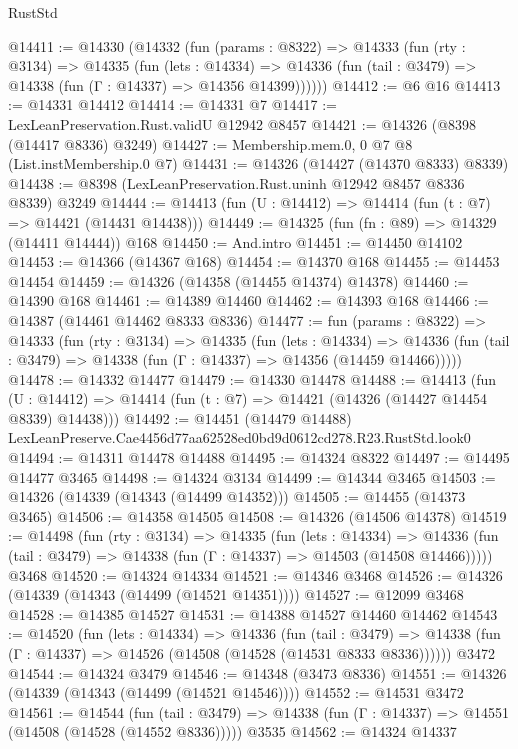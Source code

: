 \begin{lexlean}{RustStd}
\begin{coremodule}
@14411 := @14330
    (@14332
      (fun (params : @8322) =>
      @14333
        (fun (rty : @3134) =>
        @14335
          (fun (lets : @14334) =>
          @14336 (fun (tail : @3479) => @14338 (fun (Γ : @14337) => @14356 @14399))))))
@14412 := @6 @16
@14413 := @14331 @14412
@14414 := @14331 @7
@14417 := LexLeanPreservation.Rust.validU @12942 @8457
@14421 := @14326 (@8398 (@14417 @8336) @3249)
@14427 := Membership.mem.{0, 0} @7 @8 (List.instMembership.{0} @7)
@14431 := @14326 (@14427 (@14370 @8333) @8339)
@14438 := @8398 (LexLeanPreservation.Rust.uninh @12942 @8457 @8336 @8339) @3249
@14444 := @14413 (fun (U : @14412) => @14414 (fun (t : @7) => @14421 (@14431 @14438)))
@14449 := @14325 (fun (fn : @89) => @14329 (@14411 @14444)) @168
@14450 := And.intro
@14451 := @14450 @14102
@14453 := @14366 (@14367 @168)
@14454 := @14370 @168
@14455 := @14453 @14454
@14459 := @14326 (@14358 (@14455 @14374) @14378)
@14460 := @14390 @168
@14461 := @14389 @14460
@14462 := @14393 @168
@14466 := @14387 (@14461 @14462 @8333 @8336)
@14477 := fun (params : @8322) =>
  @14333
    (fun (rty : @3134) =>
    @14335
      (fun (lets : @14334) =>
      @14336 (fun (tail : @3479) => @14338 (fun (Γ : @14337) => @14356 (@14459 @14466)))))
@14478 := @14332 @14477
@14479 := @14330 @14478
@14488 := @14413
    (fun (U : @14412) => @14414 (fun (t : @7) => @14421 (@14326 (@14427 @14454 @8339) @14438)))
@14492 := @14451 (@14479 @14488) LexLeanPreserve.Cae4456d77aa62528ed0bd9d0612cd278.R23.RustStd.look0
@14494 := @14311 @14478 @14488
@14495 := @14324 @8322
@14497 := @14495 @14477 @3465
@14498 := @14324 @3134
@14499 := @14344 @3465
@14503 := @14326 (@14339 (@14343 (@14499 @14352)))
@14505 := @14455 (@14373 @3465)
@14506 := @14358 @14505
@14508 := @14326 (@14506 @14378)
@14519 := @14498
    (fun (rty : @3134) =>
    @14335
      (fun (lets : @14334) =>
      @14336 (fun (tail : @3479) => @14338 (fun (Γ : @14337) => @14503 (@14508 @14466)))))
    @3468
@14520 := @14324 @14334
@14521 := @14346 @3468
@14526 := @14326 (@14339 (@14343 (@14499 (@14521 @14351))))
@14527 := @12099 @3468
@14528 := @14385 @14527
@14531 := @14388 @14527 @14460 @14462
@14543 := @14520
    (fun (lets : @14334) =>
    @14336
      (fun (tail : @3479) =>
      @14338 (fun (Γ : @14337) => @14526 (@14508 (@14528 (@14531 @8333 @8336))))))
    @3472
@14544 := @14324 @3479
@14546 := @14348 (@3473 @8336)
@14551 := @14326 (@14339 (@14343 (@14499 (@14521 @14546))))
@14552 := @14531 @3472
@14561 := @14544
    (fun (tail : @3479) => @14338 (fun (Γ : @14337) => @14551 (@14508 (@14528 (@14552 @8336)))))
    @3535
@14562 := @14324 @14337

\end{coremodule}
\end{lexlean}
